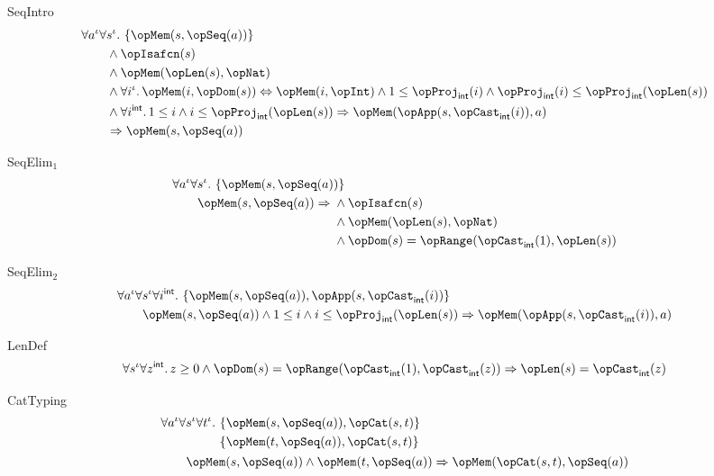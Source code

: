 \documentclass[11pt, a4paper, oneside]{article}
\begin{document}
\begin{axioms}
\item[SeqIntro] \[
        \begin{aligned}
            &\forall a^\idv \forall s^\idv.\, \st{ \opMem(s, \opSeq(a)) } \\
            &\qquad \wedge \opIsafcn(s) \\
            &\qquad \wedge \opMem(\opLen(s), \opNat) \\
            &\qquad \wedge \forall i^\idv.\, \opMem(i, \opDom(s)) \eqv \opMem(i, \opInt) \wedge 1 \le \opProj_\int(i) \wedge \opProj_\int(i) \le \opProj_\int(\opLen(s)) \\
            &\qquad \wedge \forall i^\int.\, 1 \le i \wedge i \le \opProj_\int(\opLen(s)) \imp \opMem(\opApp(s, \opCast_\int(i)), a) \\
            &\qquad \imp \opMem(s, \opSeq(a))
        \end{aligned}
    \]

\item[SeqElim$_1$] \[
        \begin{aligned}
            &\forall a^\idv \forall s^\idv.\, \st{ \opMem(s, \opSeq(a)) } \\
            &\qquad \opMem(s, \opSeq(a)) \imp \begin{aligned}[t]
                &\wedge \opIsafcn(s) \\
                &\wedge \opMem(\opLen(s), \opNat) \\
                &\wedge \opDom(s) = \opRange(\opCast_\int(1), \opLen(s))
            \end{aligned}
        \end{aligned}
    \]

\item[SeqElim$_2$] \[
        \begin{aligned}
            &\forall a^\idv \forall s^\idv \forall i^\int.\, \st{ \opMem(s, \opSeq(a)), \opApp(s, \opCast_\int(i)) } \\
            &\qquad \opMem(s, \opSeq(a)) \wedge 1 \le i \wedge i \le \opProj_\int(\opLen(s)) \imp \opMem(\opApp(s, \opCast_\int(i)), a)
        \end{aligned}
    \]

\item[LenDef] \[
        \forall s^\idv \forall z^\int.\, z \ge 0 \wedge \opDom(s) = \opRange(\opCast_\int(1), \opCast_\int(z)) \imp \opLen(s) = \opCast_\int(z)
    \]

\item[CatTyping] \[
        \begin{aligned}
            &\forall a^\idv \forall s^\idv \forall t^\idv.\, \begin{aligned}[t]
                &\st{ \opMem(s, \opSeq(a)), \opCat(s, t) } \\
                &\st{ \opMem(t, \opSeq(a)), \opCat(s, t) }
            \end{aligned} \\
            &\qquad \opMem(s, \opSeq(a)) \wedge \opMem(t, \opSeq(a)) \imp \opMem(\opCat(s, t), \opSeq(a))
        \end{aligned}
    \]


\end{axioms}
\end{document}

